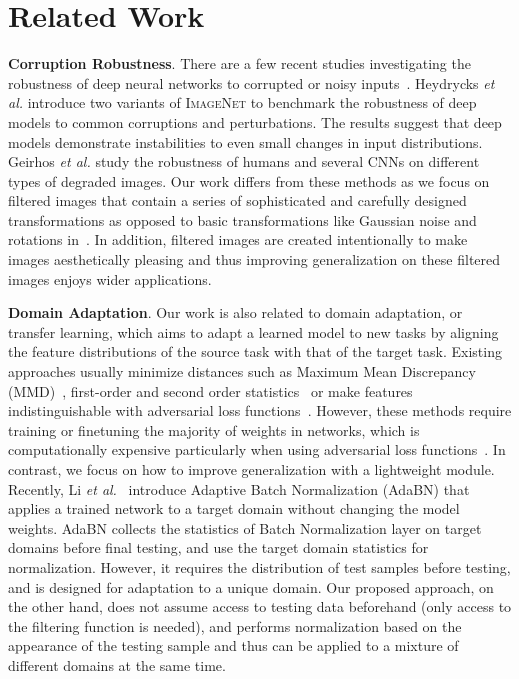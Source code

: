 \documentclass[letterpaper]{article} %
\newcommand{\imagenet}{{\scshape ImageNet}\xspace}
\begin{document}
\section{Related Work}
\textbf{Corruption Robustness}. There are a few recent studies investigating the robustness of deep neural networks to corrupted or noisy inputs~\cite{hendrycks2018benchmarking,geirhos2018generalisation}. 
Heydrycks \textit{et al.} \cite{hendrycks2018benchmarking} introduce two variants of \imagenet to benchmark the robustness of deep models to common corruptions and perturbations. 
The results suggest that deep models demonstrate instabilities to even small changes in input distributions. 
Geirhos \textit{et al.} \cite{geirhos2018generalisation} study the robustness of humans and several CNNs on different types of degraded images. Our work differs from these methods as we focus on filtered images that contain a series of sophisticated and carefully designed transformations as opposed to basic transformations like Gaussian noise and rotations in~\cite{hendrycks2018benchmarking,geirhos2018generalisation}. 
In addition, filtered images are created intentionally to make images aesthetically pleasing and thus improving generalization on these filtered images enjoys wider applications. 

\textbf{Domain Adaptation}. Our work is also related to domain adaptation, or transfer learning, which aims to adapt a learned model to new tasks by aligning the feature distributions of the source task with that of the target task. Existing approaches usually minimize distances such as Maximum Mean Discrepancy (MMD)~\cite{saito2018maximum}, first-order and second order statistics~\cite{DBLP:conf/eccv/SunS16} or make features indistinguishable with adversarial loss functions~\cite{ganin2016domain,DBLP:conf/cvpr/TzengHSD17}. However, these methods require training or finetuning the majority of weights in networks, which is computationally expensive particularly when using adversarial loss functions~\cite{arjovsky2017towards}. In contrast, we focus on how to improve generalization with a lightweight module. Recently, Li \textit{et al.}~\cite{li2016revisiting} introduce Adaptive Batch Normalization (AdaBN) that applies a trained network to a target domain without changing the model weights. AdaBN collects the statistics of Batch Normalization layer on target domains before final testing, and use the target domain statistics for normalization. However, it requires the distribution of test samples before testing, and is designed for adaptation to a unique domain. Our proposed approach, on the other hand, does not assume access to testing data beforehand (only access to the filtering function is needed), and performs normalization based on the appearance of the testing sample and thus can be applied to a mixture of different domains at the same time. 
\end{document}
